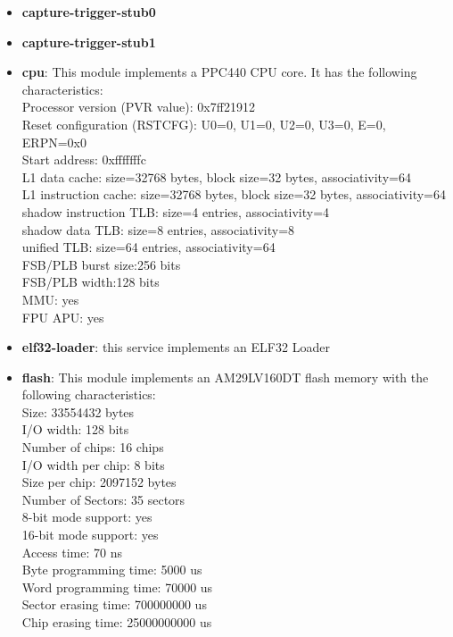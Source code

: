 \begin{itemize}\addtolength{\itemsep}{-0.40\baselineskip}
\item \textbf{capture-trigger-stub0}
\item \textbf{capture-trigger-stub1}
\item \textbf{cpu}: This module implements a PPC440 CPU core. It has the following characteristics:\\
Processor version (PVR value): 0x7ff21912\\
Reset configuration (RSTCFG): U0=0, U1=0, U2=0, U3=0, E=0, ERPN=0x0\\
Start address: 0xfffffffc\\
L1 data cache: size=32768 bytes, block size=32 bytes, associativity=64\\
L1 instruction cache: size=32768 bytes, block size=32 bytes, associativity=64\\
shadow instruction TLB: size=4 entries, associativity=4\\
shadow data TLB: size=8 entries, associativity=8\\
unified TLB: size=64 entries, associativity=64\\
FSB/PLB burst size:256 bits\\
FSB/PLB width:128 bits\\
MMU: yes\\
FPU APU: yes\\

\item \textbf{elf32-loader}: this service implements an ELF32 Loader
\item \textbf{flash}: This module implements an AM29LV160DT flash memory with the following characteristics:\\
Size: 33554432 bytes\\
I/O width: 128 bits\\
Number of chips: 16 chips\\
I/O width per chip: 8 bits\\
Size per chip: 2097152 bytes\\
Number of Sectors: 35 sectors\\
8-bit mode support: yes\\
16-bit mode support: yes\\
Access time: 70 ns\\
Byte programming time: 5000 us\\
Word programming time: 70000 us\\
Sector erasing time: 700000000 us\\
Chip erasing time: 25000000000 us\\


\end{itemize}
